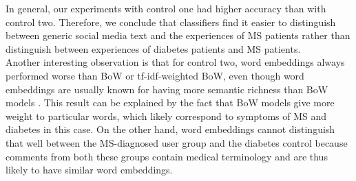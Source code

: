 \documentclass[11pt,a4paper]{article}
\begin{document}
\indent In general, our experiments with control one had higher accuracy than with control two. Therefore, we conclude that classifiers find it easier to distinguish between generic social media text and the experiences of MS patients rather than distinguish between experiences of diabetes patients and MS patients. \\
\indent Another interesting observation is that for control two, word embeddings always performed worse than BoW or tf-idf-weighted BoW, even though word embeddings are usually known for having more semantic richness than BoW models \citep{Mikolav:13}. This result can be explained by the fact that BoW models give more weight to particular words, which likely correspond to symptoms of MS and diabetes in this case. On the other hand, word embeddings cannot distinguish that well between the MS-diagnosed user group and the diabetes control because comments from both these groups contain medical terminology and are thus likely to have similar word embeddings.
\end{document}
